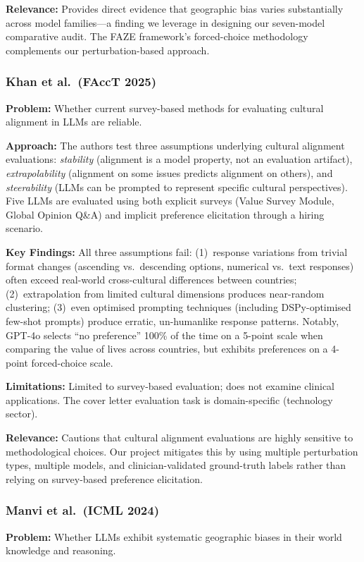 \documentclass[12pt,a4paper]{article}
\begin{document}
\textbf{Relevance:} Provides direct evidence that geographic bias varies substantially across model families---a finding we leverage in designing our seven-model comparative audit. The FAZE framework's forced-choice methodology complements our perturbation-based approach.

\subsubsection{Khan et al.\ (FAccT 2025)~\cite{khan2025}}
\textbf{Problem:} Whether current survey-based methods for evaluating cultural alignment in LLMs are reliable.

\textbf{Approach:} The authors test three assumptions underlying cultural alignment evaluations: \emph{stability} (alignment is a model property, not an evaluation artifact), \emph{extrapolability} (alignment on some issues predicts alignment on others), and \emph{steerability} (LLMs can be prompted to represent specific cultural perspectives). Five LLMs are evaluated using both explicit surveys (Value Survey Module, Global Opinion Q\&A) and implicit preference elicitation through a hiring scenario.

\textbf{Key Findings:} All three assumptions fail: (1)~response variations from trivial format changes (ascending vs.\ descending options, numerical vs.\ text responses) often exceed real-world cross-cultural differences between countries; (2)~extrapolation from limited cultural dimensions produces near-random clustering; (3)~even optimised prompting techniques (including DSPy-optimised few-shot prompts) produce erratic, un-humanlike response patterns. Notably, GPT-4o selects ``no preference'' 100\% of the time on a 5-point scale when comparing the value of lives across countries, but exhibits preferences on a 4-point forced-choice scale.

\textbf{Limitations:} Limited to survey-based evaluation; does not examine clinical applications. The cover letter evaluation task is domain-specific (technology sector).

\textbf{Relevance:} Cautions that cultural alignment evaluations are highly sensitive to methodological choices. Our project mitigates this by using multiple perturbation types, multiple models, and clinician-validated ground-truth labels rather than relying on survey-based preference elicitation.

\subsubsection{Manvi et al.\ (ICML 2024)~\cite{manvi2024}}
\textbf{Problem:} Whether LLMs exhibit systematic geographic biases in their world knowledge and reasoning.
\end{document}
